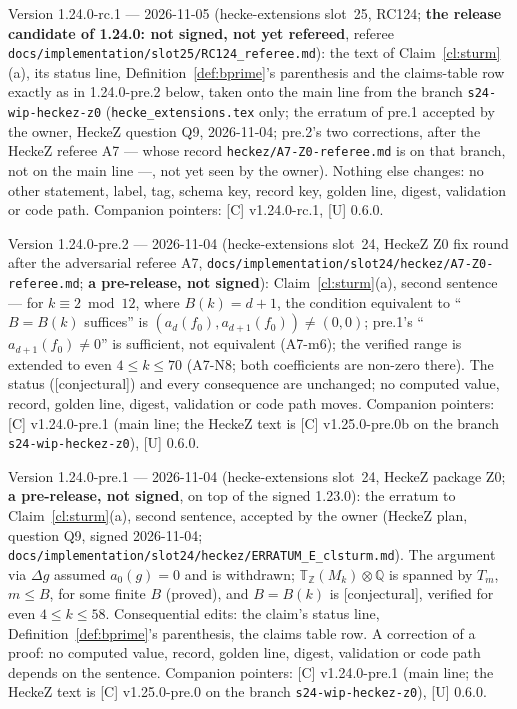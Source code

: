 \documentclass[11pt]{article}
\theoremstyle{remark}
\newcommand{\Z}{\mathbb{Z}}
\newcommand{\Q}{\mathbb{Q}}
\newcommand{\De}{\Delta}
\newcommand{\T}{\mathbb{T}}
\newcommand{\CONJ}{\textsf{[conjectural]}}
\begin{document}
Version 1.24.0-rc.1 --- 2026-11-05 (hecke-extensions slot~25, RC124; \textbf{the release candidate of 1.24.0: not signed, not yet refereed}, referee \texttt{docs/implementation/slot25/RC124\_referee.md}): the text of Claim~\ref{cl:sturm}(a), its status line, Definition~\ref{def:bprime}'s parenthesis and the claims-table row exactly as in 1.24.0-pre.2 below, taken onto the main line from the branch \texttt{s24-wip-heckez-z0} (\texttt{hecke\_extensions.tex} only; the erratum of pre.1 accepted by the owner, HeckeZ question Q9, 2026-11-04; pre.2's two corrections, after the HeckeZ referee A7 --- whose record \texttt{heckez/A7-Z0-referee.md} is on that branch, not on the main line ---, not yet seen by the owner). Nothing else changes: no other statement, label, tag, schema key, record key, golden line, digest, validation or code path. Companion pointers: [C] v1.24.0-rc.1, [U] 0.6.0.

Version 1.24.0-pre.2 --- 2026-11-04 (hecke-extensions slot~24, HeckeZ Z0 fix round after the adversarial referee A7, \texttt{docs/implementation/slot24/heckez/A7-Z0-referee.md}; \textbf{a pre-release, not signed}): Claim~\ref{cl:sturm}(a), second sentence --- for $k\equiv2\bmod12$, where $B(k)=d+1$, the condition equivalent to ``$B=B(k)$ suffices'' is $(a_d(f_0),a_{d+1}(f_0))\ne(0,0)$; pre.1's ``$a_{d+1}(f_0)\ne0$'' is sufficient, not equivalent (A7-m6); the verified range is extended to even $4\le k\le70$ (A7-N8; both coefficients are non-zero there). The status (\CONJ) and every consequence are unchanged; no computed value, record, golden line, digest, validation or code path moves. Companion pointers: [C] v1.24.0-pre.1 (main line; the HeckeZ text is [C] v1.25.0-pre.0b on the branch \texttt{s24-wip-heckez-z0}), [U] 0.6.0.

Version 1.24.0-pre.1 --- 2026-11-04 (hecke-extensions slot~24, HeckeZ package Z0; \textbf{a pre-release, not signed}, on top of the signed 1.23.0): the erratum to Claim~\ref{cl:sturm}(a), second sentence, accepted by the owner (HeckeZ plan, question Q9, signed 2026-11-04; \texttt{docs/implementation/slot24/heckez/ERRATUM\_E\_clsturm.md}). The argument via $\De g$ assumed $a_0(g)=0$ and is withdrawn; $\T_\Z(M_k)\otimes\Q$ is spanned by $T_m$, $m\le B$, for some finite $B$ (proved), and $B=B(k)$ is \CONJ, verified for even $4\le k\le58$. Consequential edits: the claim's status line, Definition~\ref{def:bprime}'s parenthesis, the claims table row. A correction of a proof: no computed value, record, golden line, digest, validation or code path depends on the sentence. Companion pointers: [C] v1.24.0-pre.1 (main line; the HeckeZ text is [C] v1.25.0-pre.0 on the branch \texttt{s24-wip-heckez-z0}), [U] 0.6.0.
\end{document}
